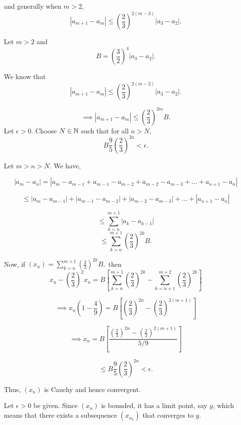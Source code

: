 \documentclass{report}
\begin{document}
and generally when $m>2,$
$$ \left|a_{m+1} - a_m\right| \leq \left(\frac{2}{3}\right)^{2(m-2)} \left|a_3 -a_2\right|.$$
\pagebreak
{}

\begin{myproof}

Let $m>2$ and $$B =\left(\frac{3}{2}\right)^{4}\left|a_3 -a_2\right|.$$

We know that  
$$ \left|a_{m+1} - a_m\right| \leq \left(\frac{2}{3}\right)^{2(m-2)} \left|a_3 -a_2\right|.$$

$$ \implies \left|a_{m+1} - a_m\right| \leq \left(\frac{2}{3}\right)^{2m}B.$$
Let $\epsilon > 0.$ Choose $N\in\NN$ such that for all $n > N$, $$ B \frac{9}{5}\left(\frac{2}{3}\right)^{2n}< \epsilon.$$

Let $m > n > N.$ We have,

$$|a_m - a_n|= |a_m - a_{m-1} + a_{m-1} - a_{m-2}  + a_{m-2} - a_{m-3}+ \dots+ a_{n+1} -  a_{n}| $$

$$\leq |a_m - a_{m-1}| + |a_{m-1} - a_{m-2}|  + 
|a_{m-2} -  a_{m-3}| + \dots + | a_{n+1} -  a_{n}| $$

$$ \leq \sum_{k={n}}^{m+1} |a_k - a_{k-1}|$$
$$ \leq \sum_{k={n}}^{m+1} \left(\frac{2}{3}\right)^{2k}B  .$$


Now, if $(x_n)= \sum_{k={n}}^{m+1} \left(\frac{2}{3}\right)^{2k}B , $ then
$$x_n - \left(\frac{2}{3}\right)^2x_n = B\left[\sum_{k={n}}^{m+1}\left(\frac{2}{3}\right)^{2k} - \sum_{k={n+1}}^{m+2}\left(\frac{2}{3}\right)^{2k}\right]$$

$$\implies x_n\left(1 - \frac{4}{9}\right) = B\left[ \left(\frac{2}{3}\right)^{2n}- \left(\frac{2}{3}\right)^{2(m+1)}\right] $$

$$\implies x_n = B\left[\frac{\left(\frac{2}{3}\right)^{2n}- \left(\frac{2}{3}\right)^{2(m+1)}}{5/9}\right] $$

$$\leq B \frac{9}{5}\left(\frac{2}{3}\right)^{2n} < \epsilon.$$


Thus, $(x_n)$ is Cauchy and hence convergent.

    
\end{myproof}

Let $\epsilon>0$ be given. Since $\left(x_n\right)$ is bounded, it has a limit point, say $y$, which means that there exists a subsequence $\left(x_{n_k}\right)$ that converges to $y$. 
\end{document}
